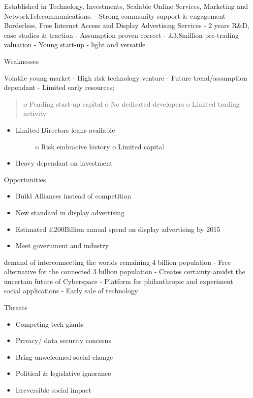 \documentclass[letterpaper,10pt,openany,oneside,english]{sphinxmanual}
\begin{document}
Established in Technology,
Investments, Scalable Online Services,
Marketing and NetworkTelecommunications.
- Strong community support \&
engagement
- Borderless, Free Internet Access and
Display Advertising Services
- 2 years R\&D, case studies \& traction
- Assumption proven correct
- £3.8million pre-trading valuation
- Young start-up - light and versatile

Weaknesses

Volatile young market
- High risk technology venture
- Future trend/assumption dependant
- Limited early resources;
\begin{quote}

o Pending start-up capital
o No dedicated developers
o Limited trading activity
\end{quote}
\begin{itemize}
\item {} \begin{description}
\item[{Limited Directors loans available}] \leavevmode
o Risk embracive history
o Limited capital

\end{description}

\item {} 
Heavy dependant on investment

\end{itemize}

Opportunities
\begin{itemize}
\item {} 
Build Alliances instead of competition

\item {} 
New standard in display advertising

\item {} 
Estimated £200Billion annual spend on display advertising by 2015

\item {} 
Meet government and industry

\end{itemize}

demand of interconnecting the worlds
remaining 4 billion population
- Free alternative for the connected 3
billion population
- Creates certainty amidst the uncertain
future of Cyberspace
- Platform for philanthropic and
experiment social applications
- Early sale of technology

Threats
\begin{itemize}
\item {} 
Competing tech giants

\item {} 
Privacy/ data security concerns

\item {} 
Bring unwelcomed social change

\item {} 
Political \& legislative ignorance

\item {} 
Irreversible social impact

\end{itemize}
\end{document}
